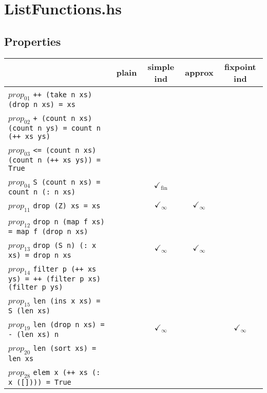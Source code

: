 \documentclass{article}
\begin{document}
\section*{ListFunctions.hs}
\subsection*{Properties}
\begin{longtable}{p{10cm} || c | c | c | c | }
  & plain & simple ind & approx & fixpoint ind \\
\hline
$prop_{01}$ \newline \verb`++ (take n xs) (drop n xs) = xs` &  &  &  &  \\
\hline
$prop_{02}$ \newline \verb`+ (count n xs) (count n ys) = count n (++ xs ys)` &  &  &  &  \\
\hline
$prop_{03}$ \newline \verb`<= (count n xs) (count n (++ xs ys)) = True` &  &  &  &  \\
\hline
$prop_{04}$ \newline \verb`S (count n xs) = count n (: n xs)` &  & $\checkmark_{\mathrm{fin}}$ &  &  \\
\hline
$prop_{11}$ \newline \verb`drop (Z) xs = xs` &  & $\checkmark_{\infty}$ & $\checkmark_{\infty}$ &  \\
\hline
$prop_{12}$ \newline \verb`drop n (map f xs) = map f (drop n xs)` &  &  &  &  \\
\hline
$prop_{13}$ \newline \verb`drop (S n) (: x xs) = drop n xs` &  & $\checkmark_{\infty}$ & $\checkmark_{\infty}$ &  \\
\hline
$prop_{14}$ \newline \verb`filter p (++ xs ys) = ++ (filter p xs) (filter p ys)` &  &  &  &  \\
\hline
$prop_{15}$ \newline \verb`len (ins x xs) = S (len xs)` &  &  &  &  \\
\hline
$prop_{19}$ \newline \verb`len (drop n xs) = - (len xs) n` &  & $\checkmark_{\infty}$ &  & $\checkmark_{\infty}$ \\
\hline
$prop_{20}$ \newline \verb`len (sort xs) = len xs` &  &  &  &  \\
\hline
$prop_{28}$ \newline \verb`elem x (++ xs (: x ([]))) = True` &  &  &  &  \\

\end{longtable}
\end{document}

